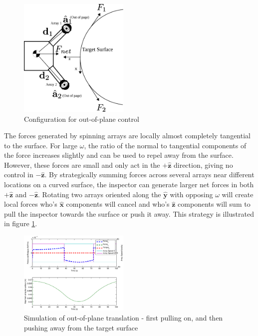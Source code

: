 \documentclass[letterpaper, 10 pt, conference]{ieeeconf}  %
\begin{document}
  \begin{figure}[thpb]
      \centering
      \includegraphics[width = 0.47\textwidth]{figures/curve_locomotion.eps}
      \caption{Configuration for out-of-plane control}
      \label{fig:outofplaneschematic}
   \end{figure}
The forces generated by spinning arrays are locally almost completely tangential to the surface. For large $\omega$, the ratio of the normal to tangential components of the force increases slightly and can be used to repel away from the surface. However, these forces are small and only act in the $+\hat{\textbf{z}}$ direction, giving no control in $-\hat{\textbf{z}}$. By strategically summing forces across several arrays near different locations on a curved surface, the inspector can generate larger net forces in both $+\hat{\textbf{z}}$ and $-\hat{\textbf{z}}$. Rotating two arrays oriented along the $\hat{\textbf{y}}$ with opposing $\omega$ will create local forces who's $\hat{\textbf{x}}$ components will cancel and who's $\hat{\textbf{z}}$ components will sum to pull the inspector towards the surface or push it away. This strategy is illustrated in figure \ref{fig:outofplaneschematic}.     

 
   
     \begin{figure}[thpb]
      \centering
      \includegraphics[width = 0.47\textwidth]{figures/curve_translations.eps}
      \caption{Simulation of out-of-plane translation - first pulling on, and then pushing away from the target surface}
      \label{fig:ooptranslation}
   \end{figure}
\end{document}
